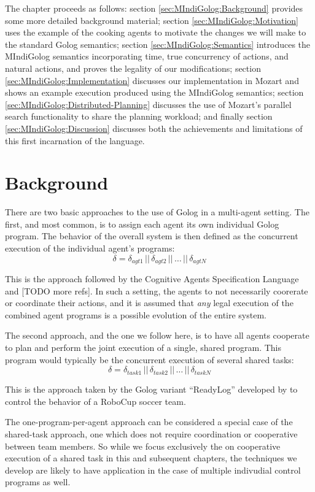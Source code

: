 The chapter proceeds as follows: section \ref{sec:MIndiGolog:Background}
provides some more detailed background material; section \ref{sec:MIndiGolog:Motivation}
uses the example of the cooking agents to motivate the changes we
will make to the standard Golog semantics; section \ref{sec:MIndiGolog:Semantics}
introduces the MIndiGolog semantics incorporating time, true concurrency
of actions, and natural actions, and proves the legality of our modifications;
section \ref{sec:MIndiGolog:Implementation} discusses our implementation
in Mozart and shows an example execution produced using the MIndiGolog
semantics; section \ref{sec:MIndiGolog:Distributed-Planning} discusses
the use of Mozart's parallel search functionality to share the planning
workload; and finally section \ref{sec:MIndiGolog:Discussion} discusses
both the achievements and limitations of this first incarnation of
the language.


\section{Background\label{sec:MIndiGolog:Background}}

There are two basic approaches to the use of Golog in a multi-agent
setting. The first, and most common, is to assign each agent its own
individual Golog program. The behavior of the overall system is then
defined as the concurrent execution of the individual agent's programs:\[
\delta=\delta_{agt1}\,||\,\delta_{agt2}\,||\,\dots\,||\,\delta_{agtN}\]


This is the approach followed by the Cognitive Agents Specification
Language \citep{shapiro02casl} and {[}TODO more refs]. In such a
setting, the agents to not necessarily coorerate or coordinate their
actions, and it is assumed that \emph{any }legal execution of the
combined agent programs is a possible evolution of the entire system.

The second approach, and the one we follow here, is to have all agents
cooperate to plan and perform the joint execution of a single, shared
program. This program would typically be the concurrent execution
of several shared tasks:\[
\delta=\delta_{task1}\,||\,\delta_{task2}\,||\,\dots\,||\,\delta_{taskN}\]


This is the approach taken by the Golog variant {}``ReadyLog'' developed
by \citet{Ferrein2005readylog} to control the behavior of a RoboCup
soccer team.

The one-program-per-agent approach can be considered a special case
of the shared-task approach, one which does not require coordination
or cooperative between team members. So while we focus exclusively
the on cooperative execution of a shared task in this and subsequent
chapters, the techniques we develop are likely to have application
in the case of multiple indivudial control programs as well.

